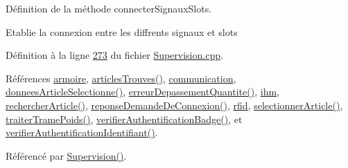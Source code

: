 Définition de la méthode connecter\+Signaux\+Slots. 

Etablie la connexion entre les diffrents signaux et slots 

Définition à la ligne \hyperlink{_supervision_8cpp_source_l00273}{273} du fichier \hyperlink{_supervision_8cpp_source}{Supervision.\+cpp}.



Références \hyperlink{_supervision_8h_source_l00084}{armoire}, \hyperlink{class_supervision_a3023468d106abfe7dc697e61a63778ed}{articles\+Trouves()}, \hyperlink{_supervision_8h_source_l00085}{communication}, \hyperlink{class_supervision_ae486eafc331964e223c35ae2b54fa669}{donnees\+Article\+Selectionne()}, \hyperlink{class_supervision_a3fb19a3c16324a21af956fd272ca469d}{erreur\+Depassement\+Quantite()}, \hyperlink{_supervision_8h_source_l00079}{ihm}, \hyperlink{_supervision_8cpp_source_l00305}{rechercher\+Article()}, \hyperlink{class_supervision_a116ed6de0e9e3c9c94886235e9f6d6e8}{reponse\+Demande\+De\+Connexion()}, \hyperlink{_supervision_8h_source_l00081}{rfid}, \hyperlink{_supervision_8cpp_source_l00320}{selectionner\+Article()}, \hyperlink{_supervision_8cpp_source_l00370}{traiter\+Trame\+Poids()}, \hyperlink{_supervision_8cpp_source_l00124}{verifier\+Authentification\+Badge()}, et \hyperlink{_supervision_8cpp_source_l00141}{verifier\+Authentification\+Identifiant()}.



Référencé par \hyperlink{_supervision_8cpp_source_l00036}{Supervision()}.


